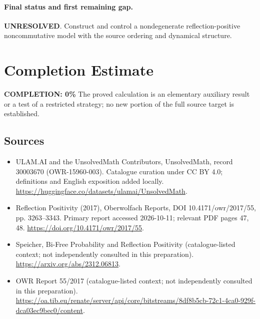 \documentclass[11pt]{article}
\begin{document}
\paragraph{Final status and first remaining gap.}
\textbf{UNRESOLVED}. Construct and control a nondegenerate reflection-positive noncommutative model with the source ordering and dynamical structure.

\section{Completion Estimate}
\noindent\textbf{COMPLETION: 0\%}
The proved calculation is an elementary auxiliary result or a test of a restricted strategy; no new portion of the full source target is established.

\subsection{Sources}
\begin{itemize}
\item[\hypertarget{source:30003670:1}{S1}] ULAM.AI and the UnsolvedMath Contributors, UnsolvedMath, record 30003670 (OWR-15960-003). Catalogue curation under CC BY 4.0; definitions and English exposition added locally.
\url{https://huggingface.co/datasets/ulamai/UnsolvedMath}.
\item[\hypertarget{source:30003670:2}{S2}] Reflection Positivity (2017), Oberwolfach Reports, DOI 10.4171/owr/2017/55, pp. 3263--3343. Primary report accessed 2026-10-11; relevant PDF pages 47, 48.
\url{https://doi.org/10.4171/owr/2017/55}.
\item[\hypertarget{source:30003670:3}{S3}] Speicher, Bi-Free Probability and Reflection Positivity (catalogue-listed context; not independently consulted in this preparation).
\url{https://arxiv.org/abs/2312.06813}.
\item[\hypertarget{source:30003670:4}{S4}] OWR Report 55/2017 (catalogue-listed context; not independently consulted in this preparation).
\url{https://oa.tib.eu/renate/server/api/core/bitstreams/8df8b5cb-72c1-4ca0-929f-dca03ec9bec0/content}.
\end{itemize}
\label{end:30003670}
\end{document}
